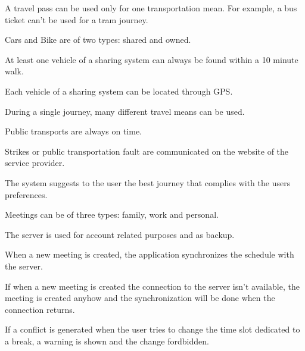 \begin{list}
\item
A travel pass can be used only for one transportation mean. For example, a bus ticket can't be used for a tram journey.
\item
Cars and Bike are of two types: shared and owned.
\item
At least one vehicle of a sharing system can always be found within a 10 minute walk.
\item
Each vehicle of a sharing system can be located through GPS.
\item
During a single journey, many different travel means can be used.
\item
Public transports are always on time.
\item
Strikes or public transportation fault are communicated on the website of the service provider. 
\item
The system suggests to the user the best journey that complies with the users preferences.
\item
Meetings can be of three types: family, work and personal.
\item
The server is used for account related purposes and as backup.
\item
When a new meeting is created, the application synchronizes the schedule with the server.
\item
If when a new meeting is created the connection to the server isn't available, the meeting is created anyhow and the synchronization will be done when the connection returns.
\item
If a conflict is generated when the user tries to change the time slot dedicated to a break, a warning is shown and the change fordbidden.
\end{list}